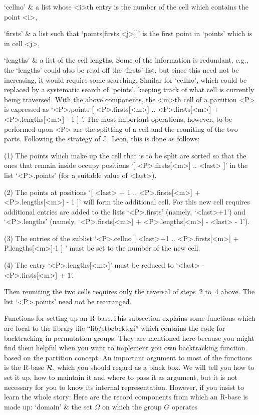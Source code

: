 `cellno' &
        a list whose <i>th entry is the number of the cell which contains
        the point <i>,

`firsts' &
        a list  such that  `points[firsts[<j>]]'  is  the first point  in
        `points' which is in cell <j>,

`lengths' &
        a list of the  cell lengths.
\enditems
Some of the information is  redundant, e.g., the  `lengths' could also be
read off the `firsts' list,  but since this   need not be increasing,  it
would    require some searching. Similar  for    `cellno', which could be
replaced by a systematic search  of `points', keeping  track of what cell
is currently being  traversed. With the above  components, the <m>th cell
of   a partition <P> is   expressed as `<P>.points{  [ <P>.firsts[<m>] ..
<P>.firsts[<m>] +  <P>.lengths[<m>]  -  1  ]   }'. The   most   important
operations, however, to be performed upon <P> are the splitting of a cell
and the reuniting  of the two parts. Following  the strategy  of J.~Leon,
this is done as follows:

(1) The points which make up the cell that  is to be  split are sorted so
that the ones  that remain inside occupy  positions `[ <P>.firsts[<m>] ..
<last> ]' in the list `<P>.points' (for a suitable value of <last>).

(2) The  points   at positions  `[   <last>  + 1 ..    <P>.firsts[<m>]  +
<P>.lengths[<m>] - 1 ]' will form the  additional cell. For this new cell
requires additional entries are  added to the lists `<P>.firsts' (namely,
`<last>+1')     and    `<P>.lengths'   (namely,      `<P>.firsts[<m>]   +
<P>.lengths[<m>] - <last> - 1').

(3) The entries of the sublist `<P>.cellno{ [ <last>+1 .. <P>.firsts[<m>]
+ P.lengths[<m>]-1 ] }' must be set to the number of the new cell.

(4) The entry    `<P>.lengths[<m>]'  must   be  reduced  to   `<last>   -
<P>.firsts[<m>] + 1'.

Then reuniting the  two cells requires  only the reversal of steps~2 to~4
above. The list `<P>.points' need not be rearranged.

\medskip
{\bsf Functions for setting up  an R-base.}\quad This subsection explains
some  {\GAP}    functions  which   are  local  to    the    library  file
``lib/stbcbckt.gi'' which    contains   the code for      backtracking in
permutation groups.  They are mentioned here  because you might find them
helpful when you want to implement you own backtracking function based on
the partition concept. An important argument  to most of the functions is
the R-base ${\cal R}$, which you should regard as a black box. We will tell you
how to  set it up,  how to maintain it and  where to pass it as argument,
but  it is not  necessary  for you  to know its  internal representation.
However,  if you insist to  learn  the whole  story:  Here are the record
components from which an R-base is made up:
\beginitems
`domain' &
    the set $\Omega$ on which the group $G$ operates

